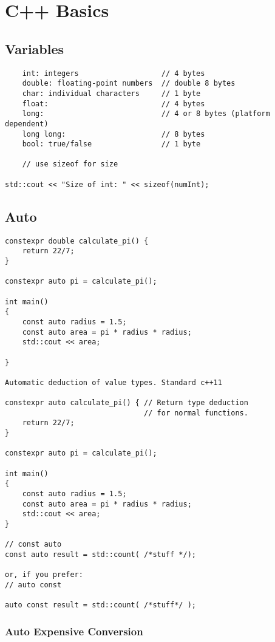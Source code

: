 \chapter{C++ Basics}

\section{Variables}

\begin{verbatim}
    int: integers                   // 4 bytes
    double: floating-point numbers  // double 8 bytes
    char: individual characters     // 1 byte
    float:                          // 4 bytes
    long:                           // 4 or 8 bytes (platform dependent)
    long long:                      // 8 bytes
    bool: true/false                // 1 byte

    // use sizeof for size

std::cout << "Size of int: " << sizeof(numInt); 
\end{verbatim}

\section{Auto}

\begin{verbatim}
constexpr double calculate_pi() {
    return 22/7;
}

constexpr auto pi = calculate_pi();

int main()
{
    const auto radius = 1.5;
    const auto area = pi * radius * radius;
    std::cout << area;

}

Automatic deduction of value types. Standard c++11

constexpr auto calculate_pi() { // Return type deduction 
                                // for normal functions.
    return 22/7;
}

constexpr auto pi = calculate_pi();

int main()
{
    const auto radius = 1.5;
    const auto area = pi * radius * radius;
    std::cout << area;
}

// const auto
const auto result = std::count( /*stuff */);

or, if you prefer:
// auto const

auto const result = std::count( /*stuff*/ );
\end{verbatim}

\subsection{Auto Expensive Conversion}

